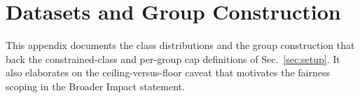\documentclass[10pt]{article}
\begin{document}



% 

\section{Datasets and Group Construction}
\label{app:groups}

This appendix documents the class distributions and the group
construction that back the constrained-class and per-group cap
definitions of Sec.~\ref{sec:setup}. It also elaborates on the
ceiling-versus-floor caveat that motivates the fairness scoping in the
Broader Impact statement.

\end{document}
